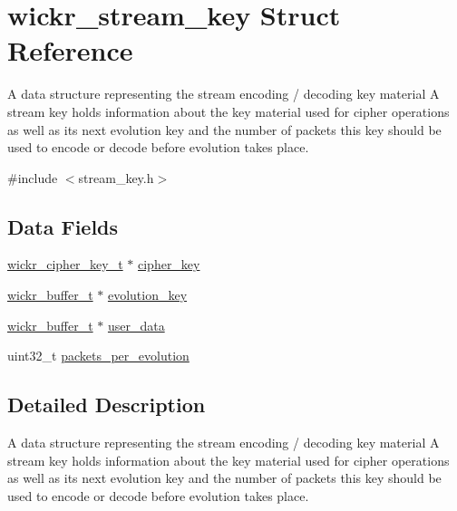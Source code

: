 \hypertarget{structwickr__stream__key}{}\section{wickr\+\_\+stream\+\_\+key Struct Reference}
\label{structwickr__stream__key}


A data structure representing the stream encoding / decoding key material A stream key holds information about the key material used for cipher operations as well as it\textquotesingle{}s next evolution key and the number of packets this key should be used to encode or decode before evolution takes place.  




{\ttfamily \#include $<$stream\+\_\+key.\+h$>$}

\subsection*{Data Fields}
\begin{DoxyCompactItemize}
\item 
\mbox{\hyperlink{structwickr__cipher__key}{wickr\+\_\+cipher\+\_\+key\+\_\+t}} $\ast$ \mbox{\hyperlink{structwickr__stream__key_a3d957a51193dda882cb89ced2ceeb91e}{cipher\+\_\+key}}
\item 
\mbox{\hyperlink{structwickr__buffer}{wickr\+\_\+buffer\+\_\+t}} $\ast$ \mbox{\hyperlink{structwickr__stream__key_ae7210bd67e61cb4c38733a237dae95d9}{evolution\+\_\+key}}
\item 
\mbox{\hyperlink{structwickr__buffer}{wickr\+\_\+buffer\+\_\+t}} $\ast$ \mbox{\hyperlink{structwickr__stream__key_a51e59da9f7fbb0b3e1332a20252d1cc6}{user\+\_\+data}}
\item 
uint32\+\_\+t \mbox{\hyperlink{structwickr__stream__key_a78777e4c64048b6dae38f8772744194e}{packets\+\_\+per\+\_\+evolution}}
\end{DoxyCompactItemize}


\subsection{Detailed Description}
A data structure representing the stream encoding / decoding key material A stream key holds information about the key material used for cipher operations as well as it\textquotesingle{}s next evolution key and the number of packets this key should be used to encode or decode before evolution takes place. 

